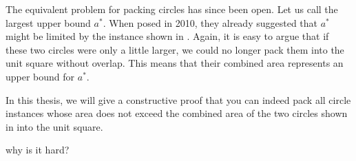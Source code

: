 \documentclass[a4paper,style=print,bibliography=totoc,nexus,lnum,extramargin]{tubsbook}
\begin{document}


The equivalent problem for packing circles has since been open.
Let us call the largest upper bound $a^*$. When \textcite{DFL2010circle} posed  in 2010, they already suggested that $a^*$ might be limited by the instance shown in . Again, it is easy to argue that if these two circles were only a little larger, we could no longer pack them into the unit square without overlap. This means that their combined area represents an upper bound for $a^*$. 


In this thesis, we will give a constructive proof that you can indeed pack all circle instances whose area does not exceed the combined area of the two circles shown in  into the unit square.

why is it hard?





\end{document}
